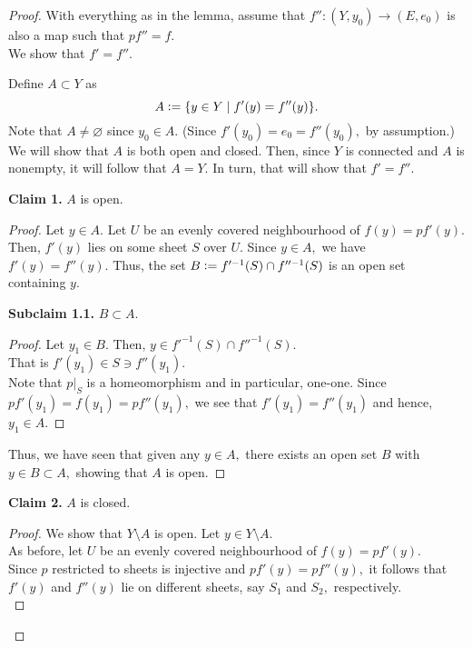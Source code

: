 \documentclass[12pt]{article}
\theoremstyle{definition}
\numberwithin{thm}{section}
\let\emptyset\varnothing
\newenvironment{blockquote}
{\begin{mdframed}[skipabove=0pt, skipbelow=0pt, innertopmargin=4pt, innerbottommargin=4pt, bottomline=false,topline=false,rightline=false, linewidth=2pt]}
{\end{mdframed}}
\begin{document}
\begin{proof} 
	With everything as in the lemma, assume that $f'':(Y, y_0) \to (E, e_0)$ is also a map such that $pf'' = f.$\\
	We show that $f' = f''.$

	Define $A \subset Y$ as
	\begin{equation*} 
		A \vcentcolon= \{y \in Y \mid f'(y) = f''(y)\}.
	\end{equation*}
	Note that $A \neq \emptyset$ since $y_0 \in A.$ (Since $f'(y_0) = e_0 = f''(y_0),$ by assumption.)\\
	We will show that $A$ is both open and closed. Then, since $Y$ is connected and $A$ is nonempty, it will follow that $A = Y.$ In turn, that will show that $f' = f''.$\\
	\begin{blockquote}
		\textbf{Claim 1.} $A$ is open.
		\begin{proof} 
			Let $y \in A.$ Let $U$ be an evenly covered neighbourhood of $f(y) = pf'(y).$\\
			Then, $f'(y)$ lies on some sheet $S$ over $U.$ Since $y \in A,$ we have $f'(y) = f''(y).$ Thus, the set $B \vcentcolon= f'^{-1}(S) \cap f''^{-1}(S)$ is an open set containing $y.$\\
			\begin{blockquote}
				\textbf{Subclaim 1.1.} $B \subset A.$
				\begin{proof} 
					Let $y_1 \in B.$ Then, $y \in f'^{-1}(S) \cap f''^{-1}(S).$ \\
					That is $f'(y_1) \in S \ni f''(y_1).$\\
					Note that $p|_S$ is a homeomorphism and in particular, one-one. Since $pf'(y_1) = f(y_1) = pf''(y_1),$ we see that $f'(y_1) = f''(y_1)$ and hence, $y_1 \in A.$
				\end{proof}
			\end{blockquote}
			Thus, we have seen that given any $y \in A,$ there exists an open set $B$ with $y \in B \subset A,$ showing that $A$ is open.
		\end{proof}
	\end{blockquote}
	\begin{blockquote}
		\textbf{Claim 2.} $A$ is closed.
		\begin{proof} 
			We show that $Y\setminus A$ is open. Let $y \in Y\setminus A.$\\
			As before, let $U$ be an evenly covered neighbourhood of $f(y) = pf'(y).$\\
			Since $p$ restricted to sheets is injective and $pf'(y) = pf''(y),$ it follows that $f'(y)$ and $f''(y)$ lie on different sheets, say $S_1$ and $S_2,$ respectively.\\

\end{proof}
\end{blockquote}
\end{proof}
\end{document}
